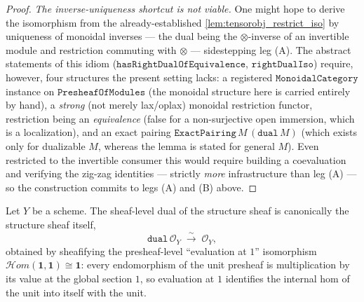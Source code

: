 \begin{proof}
  \emph{The inverse-uniqueness shortcut is not viable.} One might hope to derive the
  isomorphism from the already-established \cref{lem:tensorobj_restrict_iso} by uniqueness of
  monoidal inverses --- the dual being the \(\otimes\)-inverse of an invertible module and
  restriction commuting with \(\otimes\) --- sidestepping leg (A). The abstract statements of
  this idiom (\(\mathtt{hasRightDualOfEquivalence}\), \(\mathtt{rightDualIso}\)) require,
  however, four structures the present setting lacks: a registered \(\mathtt{MonoidalCategory}\)
  instance on \(\mathtt{PresheafOfModules}\) (the monoidal structure here is carried entirely
  by hand), a \emph{strong} (not merely lax/oplax) monoidal restriction functor, restriction
  being an \emph{equivalence} (false for a non-surjective open immersion, which is a
  localization), and an exact pairing \(\mathtt{ExactPairing}\,M\,(\mathtt{dual}\,M)\) (which
  exists only for dualizable \(M\), whereas the lemma is stated for general \(M\)). Even
  restricted to the invertible consumer this would require building a coevaluation and
  verifying the zig-zag identities --- strictly \emph{more} infrastructure than leg (A) --- so
  the construction commits to legs (A) and (B) above.
\end{proof}

\begin{lemma}\leanok
  \label{lem:dual_unit_iso}
  Let \(Y\) be a scheme. The sheaf-level dual of the structure sheaf is canonically the
  structure sheaf itself,
  \[
    \mathtt{dual}\,\mathcal{O}_Y \;\xrightarrow{\ \sim\ }\; \mathcal{O}_Y,
  \]
  obtained by sheafifying the presheaf-level ``evaluation at \(1\)'' isomorphism
  \(\mathcal{H}om(\mathbf{1}, \mathbf{1}) \cong \mathbf{1}\): every endomorphism of the
  unit presheaf is multiplication by its value at the global section \(1\), so evaluation
  at \(1\) identifies the internal hom of the unit into itself with the unit.
\end{lemma}

